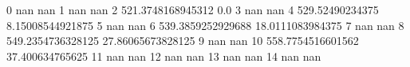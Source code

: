 0 nan nan
1 nan nan
2 521.3748168945312 0.0
3 nan nan
4 529.52490234375 8.15008544921875
5 nan nan
6 539.3859252929688 18.0111083984375
7 nan nan
8 549.2354736328125 27.86065673828125
9 nan nan
10 558.7754516601562 37.400634765625
11 nan nan
12 nan nan
13 nan nan
14 nan nan
